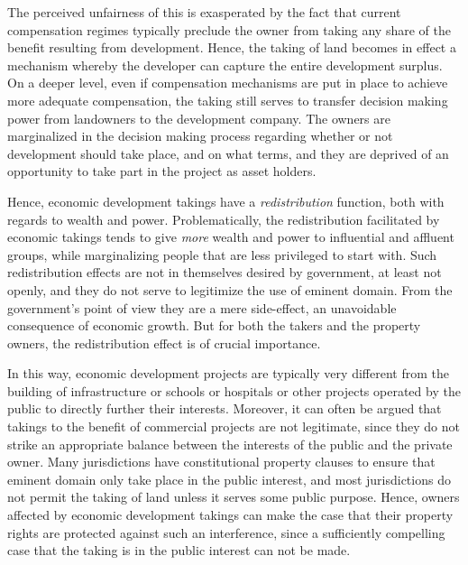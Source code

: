 The perceived unfairness of this is exasperated by the fact that current compensation regimes typically preclude the owner from taking any share of the benefit resulting from development. Hence, the taking of land becomes in effect a mechanism whereby the developer can capture the entire development surplus. On a deeper level, even if compensation mechanisms are put in place to achieve more adequate compensation, the taking still serves to transfer decision making power from landowners to the development company. The owners are marginalized in the decision making process regarding whether or not development should take place, and on what terms, and they are deprived of an opportunity to take part in the project as asset holders.

Hence, economic development takings have a {\it redistribution} function, both with regards to wealth and power. Problematically, the redistribution facilitated by economic takings tends to give {\it more} wealth and power to influential and affluent groups, while marginalizing people that are less privileged to start with. Such redistribution effects are not in themselves desired by government, at least not openly, and they do not serve to legitimize the use of eminent domain. From the government's point of view they are a mere side-effect, an unavoidable consequence of economic growth. But for both the takers and the property owners, the redistribution effect is of crucial importance. 

In this way, economic development projects are typically very different from the building of infrastructure or schools or hospitals or other projects operated by the public to directly further their interests. Moreover, it can often be argued that takings to the benefit of commercial projects are not legitimate, since they do not strike an appropriate balance between the interests of the public and the private owner. Many jurisdictions have constitutional property clauses to ensure that eminent domain only take place in the public interest, and most jurisdictions do not permit the taking of land unless it serves some public purpose. Hence, owners affected by economic development takings can make the case that their property rights are protected against such an interference, since a sufficiently compelling case that the taking is in the public interest can not be made.

